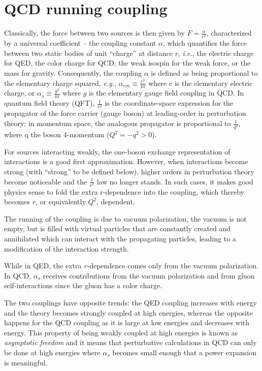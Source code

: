 \documentclass[../main.tex]{subfiles}
\begin{document}
\section{QCD running coupling}

Classically, the force between two sources is then given by $F = \frac{\alpha}{r^2}$, 
characterized by a universal coefficient -- the coupling constant $\alpha$, which 
quantifies the force between two static bodies of unit “charge” at distance $r$,
\textit{i.e.}, the electric charge for QED, the color charge for QCD, the weak isospin
for the weak force, or the mass for gravity. Consequently, the coupling $\alpha$ is defined
as being proportional to the elementary charge squared, \textit{e.g.}, $\alpha_{em} \equiv \frac{e^2}{4\pi}$ where 
$e$ is the elementary electric charge, or $\alpha_s \equiv \frac{g^2}{4\pi}$ where $g$ is the elementary gauge field
coupling in QCD.
In quantum field theory (QFT), $\frac{1}{r^2}$ is the coordinate-space expression
for the propagator of the force carrier (gauge boson) at leading-order in perturbation
theory: in momentum space, the analogous propagator is proportional to $\frac{1}{q^2}$, where q
the boson 4-momentum ($Q^2=-q^2>0$).

For sources interacting weakly, the one-boson exchange representation of interactions
is a good first approximation. However, when interactions become strong (with “strong”
to be defined below), higher orders in perturbation theory become noticeable and the
$\frac{1}{r^2}$ law no longer stands. In such cases, it makes good physics sense to fold the extra r-dependence
into the coupling, which thereby becomes $r$, or equivalently $Q^2$, dependent.

The running of the coupling is due to vacuum polarization, the vacuum is not empty, but is filled 
with virtual particles that are constantly created and annihilated which can interact with the propagating particles,
leading to a modification of the interaction strength. 

While in QED, the extra $r$-dependence comes only from the vacuum polarization. In QCD, 
$\alpha_s$ receives contributions from the vacuum polarization and from gluon self-interactions since the gluon 
has a color charge.

The two couplings have opposite trends: the QED coupling increases with energy and the theory becomes strongly
coupled at high energies, whereas the opposite happens for the QCD coupling as it is large at low
energies and decreases with energy. This property of being weakly coupled at high energies is
known as \emph{asymptotic freedom} and it means that perturbative calculations in QCD can only be
done at high energies where $\alpha_s$ becomes small enough that a power expansion is meaningful.
\end{document}
